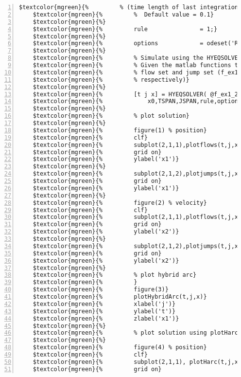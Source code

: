 \begin{Verbatim}[commandchars=\$\{\},numbers=left,numbersep=2pt]
    $textcolor{mgreen}{%         % (time length of last integration)*maxStepCoefficient.} 
    $textcolor{mgreen}{%         %  Default value = 0.1} 
    $textcolor{mgreen}{%} 
    $textcolor{mgreen}{%         rule               = 1;} 
    $textcolor{mgreen}{%} 
    $textcolor{mgreen}{%         options            = odeset('RelTol',1e-6,'MaxStep',.1);} 
    $textcolor{mgreen}{%} 
    $textcolor{mgreen}{%         % Simulate using the HYEQSOLVER script} 
    $textcolor{mgreen}{%         % Given the matlab functions that models the flow map, jump map,} 
    $textcolor{mgreen}{%         % flow set and jump set (f_ex1_2, g_ex1_2, C_ex1_2, and D_ex1_2} 
    $textcolor{mgreen}{%         % respectively)} 
    $textcolor{mgreen}{%} 
    $textcolor{mgreen}{%         [t j x] = HYEQSOLVER( @f_ex1_2,@g_ex1_2,@C_ex1_2,@D_ex1_2,...} 
    $textcolor{mgreen}{%             x0,TSPAN,JSPAN,rule,options,'ode45');} 
    $textcolor{mgreen}{%} 
    $textcolor{mgreen}{%         % plot solution} 
    $textcolor{mgreen}{%} 
    $textcolor{mgreen}{%         figure(1) % position} 
    $textcolor{mgreen}{%         clf} 
    $textcolor{mgreen}{%         subplot(2,1,1),plotflows(t,j,x(:,1))} 
    $textcolor{mgreen}{%         grid on} 
    $textcolor{mgreen}{%         ylabel('x1')} 
    $textcolor{mgreen}{%} 
    $textcolor{mgreen}{%         subplot(2,1,2),plotjumps(t,j,x(:,1))} 
    $textcolor{mgreen}{%         grid on} 
    $textcolor{mgreen}{%         ylabel('x1')} 
    $textcolor{mgreen}{%} 
    $textcolor{mgreen}{%         figure(2) % velocity} 
    $textcolor{mgreen}{%         clf} 
    $textcolor{mgreen}{%         subplot(2,1,1),plotflows(t,j,x(:,2))} 
    $textcolor{mgreen}{%         grid on} 
    $textcolor{mgreen}{%         ylabel('x2')} 
    $textcolor{mgreen}{%} 
    $textcolor{mgreen}{%         subplot(2,1,2),plotjumps(t,j,x(:,2))} 
    $textcolor{mgreen}{%         grid on} 
    $textcolor{mgreen}{%         ylabel('x2')} 
    $textcolor{mgreen}{%} 
    $textcolor{mgreen}{%         % plot hybrid arc} 
    $textcolor{mgreen}{%         } 
    $textcolor{mgreen}{%         figure(3)} 
    $textcolor{mgreen}{%         plotHybridArc(t,j,x)} 
    $textcolor{mgreen}{%         xlabel('j')} 
    $textcolor{mgreen}{%         ylabel('t')} 
    $textcolor{mgreen}{%         zlabel('x1')} 
    $textcolor{mgreen}{%} 
    $textcolor{mgreen}{%         % plot solution using plotHarc and plotHarcColor} 
    $textcolor{mgreen}{%} 
    $textcolor{mgreen}{%         figure(4) % position} 
    $textcolor{mgreen}{%         clf} 
    $textcolor{mgreen}{%         subplot(2,1,1), plotHarc(t,j,x(:,1));} 
    $textcolor{mgreen}{%         grid on} 

\end{Verbatim}
